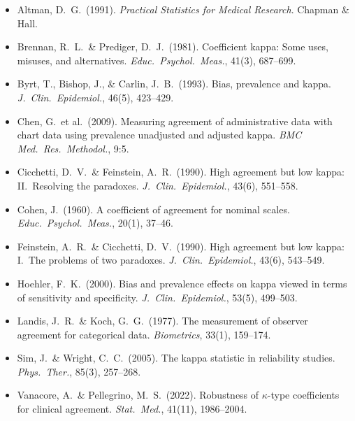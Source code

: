 \documentclass[11pt]{article}
\begin{document}
\small
\begin{itemize}[nosep, leftmargin=1.5em]
\item Altman, D.\ G.\ (1991). \textit{Practical Statistics for Medical Research}. Chapman \& Hall.
\item Brennan, R.\ L.\ \& Prediger, D.\ J.\ (1981). Coefficient kappa: Some uses, misuses, and alternatives. \textit{Educ.\ Psychol.\ Meas.}, 41(3), 687--699.
\item Byrt, T., Bishop, J., \& Carlin, J.\ B.\ (1993). Bias, prevalence and kappa. \textit{J.\ Clin.\ Epidemiol.}, 46(5), 423--429.
\item Chen, G.\ et al.\ (2009). Measuring agreement of administrative data with chart data using prevalence unadjusted and adjusted kappa. \textit{BMC Med.\ Res.\ Methodol.}, 9:5.
\item Cicchetti, D.\ V.\ \& Feinstein, A.\ R.\ (1990). High agreement but low kappa: II.\ Resolving the paradoxes. \textit{J.\ Clin.\ Epidemiol.}, 43(6), 551--558.
\item Cohen, J.\ (1960). A coefficient of agreement for nominal scales. \textit{Educ.\ Psychol.\ Meas.}, 20(1), 37--46.
\item Feinstein, A.\ R.\ \& Cicchetti, D.\ V.\ (1990). High agreement but low kappa: I.\ The problems of two paradoxes. \textit{J.\ Clin.\ Epidemiol.}, 43(6), 543--549.
\item Hoehler, F.\ K.\ (2000). Bias and prevalence effects on kappa viewed in terms of sensitivity and specificity. \textit{J.\ Clin.\ Epidemiol.}, 53(5), 499--503.
\item Landis, J.\ R.\ \& Koch, G.\ G.\ (1977). The measurement of observer agreement for categorical data. \textit{Biometrics}, 33(1), 159--174.
\item Sim, J.\ \& Wright, C.\ C.\ (2005). The kappa statistic in reliability studies. \textit{Phys.\ Ther.}, 85(3), 257--268.
\item Vanacore, A.\ \& Pellegrino, M.\ S.\ (2022). Robustness of $\kappa$-type coefficients for clinical agreement. \textit{Stat.\ Med.}, 41(11), 1986--2004.
\end{itemize}
\end{document}
